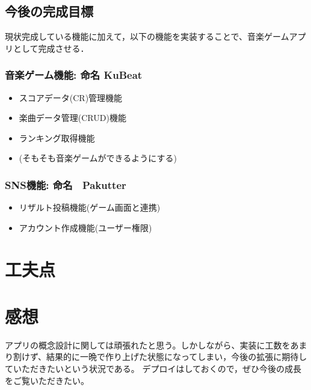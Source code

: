 \documentclass[a4j]{jarticle}
\begin{document}
\subsection{今後の完成目標}
現状完成している機能に加えて，以下の機能を実装することで、音楽ゲームアプリとして完成させる．
\subsubsection*{音楽ゲーム機能: 命名 KuBeat}
\begin{itemize}
  \item スコアデータ(CR)管理機能
  \item 楽曲データ管理(CRUD)機能
  \item ランキング取得機能
  \item (そもそも音楽ゲームができるようにする)
\end{itemize}
\subsubsection*{SNS機能: 命名　Pakutter}
\begin{itemize}  
  \item リザルト投稿機能(ゲーム画面と連携)
  \item アカウント作成機能(ユーザー権限)
\end{itemize}

\section{工夫点}

\section{感想}
アプリの概念設計に関しては頑張れたと思う。しかしながら、実装に工数をあまり割けず、結果的に一晩で作り上げた状態になってしまい，今後の拡張に期待していただきたいという状況である。
デプロイはしておくので，ぜひ今後の成長をご覧いただきたい。
\end{document}
